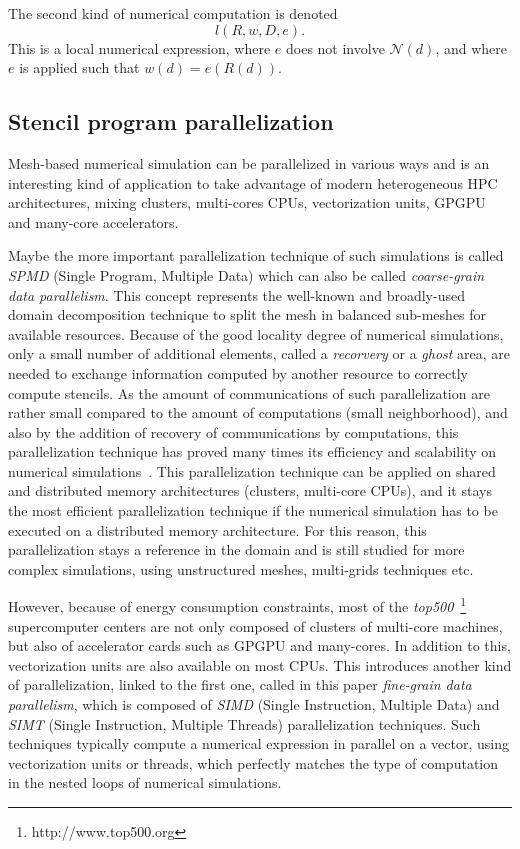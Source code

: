 The second kind of numerical computation is denoted
\begin{equation}
l(R,w,D,e).
\end{equation}
This is a local numerical expression, where $e$ does not involve $\mathcal{N}(d)$, and where $e$ is applied such that $w(d) = e(R(d))$.

\subsection{Stencil program parallelization}
\label{sect:parall}
Mesh-based numerical simulation can be parallelized in various ways and is an interesting kind of application to take advantage of modern heterogeneous HPC architectures, mixing clusters, multi-cores CPUs, vectorization units, GPGPU and many-core accelerators.

Maybe the more important parallelization technique of such simulations is called \textit{SPMD} (Single Program, Multiple Data) which can also be called \textit{coarse-grain data parallelism}. This concept represents the well-known and broadly-used domain decomposition technique to split the mesh in balanced sub-meshes for available resources. Because of the good locality degree of numerical simulations, only a small number of additional elements, called a \textit{recorvery} or a \textit{ghost} area, are needed to exchange information computed by another resource to correctly compute stencils. As the amount of communications of such parallelization are rather small compared to the amount of computations (small neighborhood), and also by the addition of recovery of communications by computations, this parallelization technique has proved many times its efficiency and scalability on numerical simulations~\cite{}. This parallelization technique can be applied on shared and distributed memory architectures (clusters, multi-core CPUs), and it stays the most efficient parallelization technique if the numerical simulation has to be executed on a distributed memory architecture. For this reason, this parallelization stays a reference in the domain and is still studied for more complex simulations, using unstructured meshes, multi-grids techniques etc.

However, because of energy consumption constraints, most of the \textit{top500}~\footnote{http://www.top500.org} supercomputer centers are not only composed of clusters of multi-core machines, but also of accelerator cards such as GPGPU and many-cores. In addition to this, vectorization units are also available on most CPUs. This introduces another kind of parallelization, linked to the first one, called in this paper \textit{fine-grain data parallelism}, which is composed of \textit{SIMD} (Single Instruction, Multiple Data) and \textit{SIMT} (Single Instruction, Multiple Threads) parallelization techniques. Such techniques typically compute a numerical expression in parallel on a vector, using vectorization units or threads, which perfectly matches the type of computation in the nested loops of numerical simulations.

